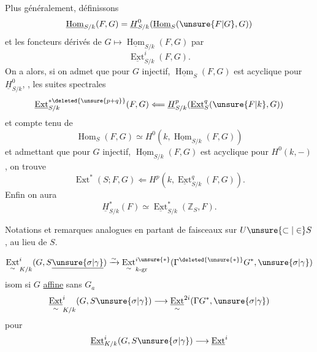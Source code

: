 Plus généralement, définissons
\[
\underline{\operatorname{Hom}}_{S/k}(F,G)=
\underline H^0_{S/k}(\underline{\operatorname{Hom}}_S(\unsure{F|G},G))
\]
 et  les foncteurs dérivés de
$G\longmapsto\underline{\operatorname{Hom}}_{S/k}(F,G)$ par
\[
\underline{\operatorname{Ext}}^i_{S/k}(F,G).
\]
On a alors, si on admet que pour $G$ injectif,
$\underline{\operatorname{Hom}}_S(F,G)$ est acyclique pour
$\underline H^0_{S/k}$, , les suites spectrales
\[
\underline{\operatorname{Ext}}^{*\deleted{\unsure{p+q}}}_{S/k}(F,G)
\Longleftarrow\underline H^p_{S/k}
(\underline{\operatorname{Ext}}^q_S(\unsure{F|k},G))
\]
et compte tenu de
\[
\operatorname{Hom}_S(F,G)\simeq
H^0(k,\underline{\operatorname{Hom}}_{S/k}(F,G))
\]
et admettant que pour $G$ injectif,
$\underline{\operatorname{Hom}}_{S/k}(F,G)$ est acyclique pour $H^0(k,-)$,
on trouve
\[
\operatorname{Ext}^*(S;F,G)\Longleftarrow
H^p(k,\underline{\operatorname{Ext}}^q_{S/k}(F,G)).
\]
Enfin on aura
\[
\underline H^*_{S/k}(F)\simeq
\underline{\operatorname{Ext}}^*_{S/k}(\mathbb Z_S,F).
\]

Notations et remarques analogues en partant de faisceaux sur
$U\unsure{\subset|\in}S$, au lieu de $S$.

\[
\underset{\sim}{\operatorname{Ext}}^i_{K/k}(G,S\underline{\unsure{\sigma|\gamma}})
\xrightarrow{\sim}
\underset{\sim}{\operatorname{Ext}}^{i\unsure{*}}_{k\text{-gr}}
(\Gamma^{\deleted{\unsure{*}}}G^*,\unsure{\sigma|\gamma})
\]
isom si $G$ \uline{affine} sans  $G_a$
\[
\underset{\sim}{\underline{\operatorname{Ext}}}^{i}_{K/k}(G,S\unsure{\sigma|\gamma})
\longrightarrow
\underset{\sim}{\underline{\operatorname{Ext}}}^{2i}(\Gamma G^*,\unsure{\sigma|\gamma})
\]
pour
\[
\underline{\operatorname{Ext}}^i_{K/k}(G,S\unsure{\sigma|\gamma})
\longrightarrow \underline{\operatorname{Ext}}^i
\]


